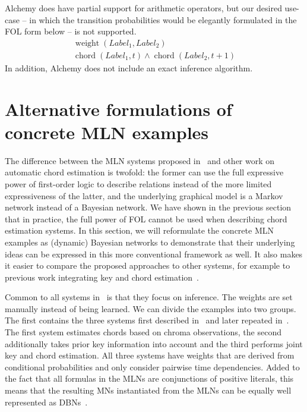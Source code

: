 \documentclass[letterpaper]{article} %
\begin{document}

Alchemy does have partial support for arithmetic operators, but our desired use-case -- in which the transition probabilities would be elegantly formulated in the FOL form below -- is not supported.
\begin{multline}
\operatorname{weight}\left(Label_1,Label_2\right) \\ \operatorname{chord}\left(Label_1, t\right) \wedge \operatorname{chord}\left(Label_2, t+1\right)
\end{multline}
In addition, Alchemy does not include an exact inference algorithm.


\section{Alternative formulations of concrete MLN examples}

The difference between the MLN systems proposed in~\cite{papadopoulos2012ismir,papadopoulos2013icassp,papadopoulos2017taslp} and other work on automatic chord estimation is twofold: the former can use the full expressive power of first-order logic to describe relations instead of the more limited expressiveness of the latter, and the underlying graphical model is a Markov network instead of a Bayesian network. We have shown in the previous section that in practice, the full power of FOL cannot be used when describing chord estimation systems. In this section, we will reformulate the concrete MLN examples as (dynamic) Bayesian networks to demonstrate that their underlying ideas can be expressed in this more conventional framework as well. It also makes it easier to compare the proposed approaches to other systems, for example to previous work integrating key and chord estimation~\cite{mauch2010taslp,pauwels2014jnmr}.

Common to all systems in~\cite{papadopoulos2012ismir,papadopoulos2013icassp,papadopoulos2017taslp} is that they focus on inference. The weights are set manually instead of being learned. We can divide the examples into two groups. The first contains the three systems first described in~\cite{papadopoulos2012ismir} and later repeated in~\cite{papadopoulos2017taslp}. The first system estimates chords based on chroma observations, the second additionally takes prior key information into account and the third performs joint key and chord estimation. All three systems have weights that are derived from conditional probabilities and only consider pairwise time dependencies. Added to the fact that all formulas in the MLNs are conjunctions of positive literals, this means that the resulting MNs instantiated from the MLNs can be equally well represented as DBNs~\cite{sang2005aaai}.
\end{document}
